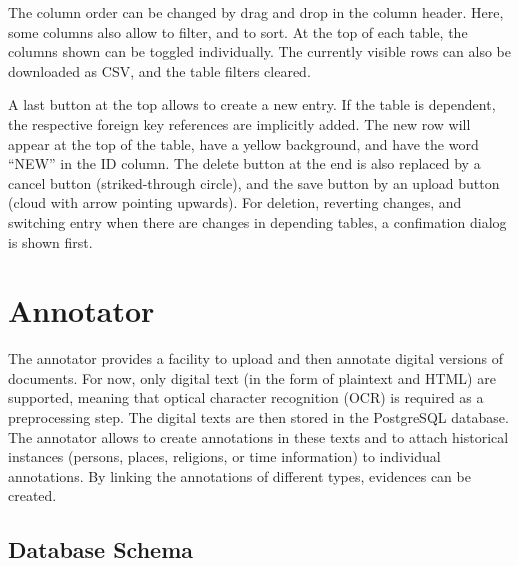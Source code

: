 The column order can be changed by drag and drop in the column header.
Here, some columns also allow to filter, and to sort.
At the top of each table, the columns shown can be toggled individually.
The currently visible rows can also be downloaded as CSV, and the table filters cleared.

A last button at the top allows to create a new entry.
If the table is dependent, the respective foreign key references are implicitly added.
The new row will appear at the top of the table, have a yellow background, and have the word \enquote{NEW} in the ID column.
The delete button at the end is also replaced by a cancel button (striked-through circle), and the save button by an upload button (cloud with arrow pointing upwards).
For deletion, reverting changes, and switching entry when there are changes in depending tables, a confimation dialog is shown first.

\section{Annotator}
\label{sec:annotator}

The annotator provides a facility to upload and then annotate digital versions of documents.
For now, only digital text (in the form of plaintext and HTML) are supported, meaning that optical character recognition (OCR) is required as a preprocessing step.
The digital texts are then stored in the PostgreSQL database.
The annotator allows to create annotations in these texts and to attach historical instances (persons, places, religions, or time information) to individual annotations.
By linking the annotations of different types, evidences can be created.


\subsection{Database Schema}
\label{sec:database-schema}

